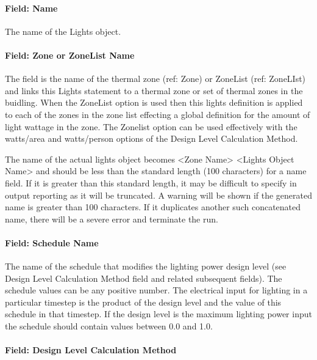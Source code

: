 \paragraph{Field: Name}\label{field-name-2-020}

The name of the Lights object.

\paragraph{Field: Zone or ZoneList Name}\label{field-zone-or-zonelist-name-1-000}

The field is the name of the thermal zone (ref: Zone) or ZoneList (ref: ZoneLIst) and links this Lights statement to a thermal zone or set of thermal zones in the buidling. When the ZoneList option is used then this lights definition is applied to each of the zones in the zone list effecting a global definition for the amount of light wattage in the zone. The Zonelist option can be used effectively with the watts/area and watts/person options of the Design Level Calculation Method.

The name of the actual lights object becomes \textless{}Zone Name\textgreater{} \textless{}Lights Object Name\textgreater{} and should be less than the standard length (100 characters) for a name field. If it is greater than this standard length, it may be difficult to specify in output reporting as it will be truncated. A warning will be shown if the generated name is greater than 100 characters. If it duplicates another such concatenated name, there will be a severe error and terminate the run.

\paragraph{Field: Schedule Name}\label{field-schedule-name-002}

The name of the schedule that modifies the lighting power design level (see Design Level Calculation Method field and related subsequent fields). The schedule values can be any positive number. The electrical input for lighting in a particular timestep is the product of the design level and the value of this schedule in that timestep. If the design level is the maximum lighting power input the schedule should contain values between 0.0 and 1.0.

\paragraph{Field: Design Level Calculation Method}\label{field-design-level-calculation-method}

